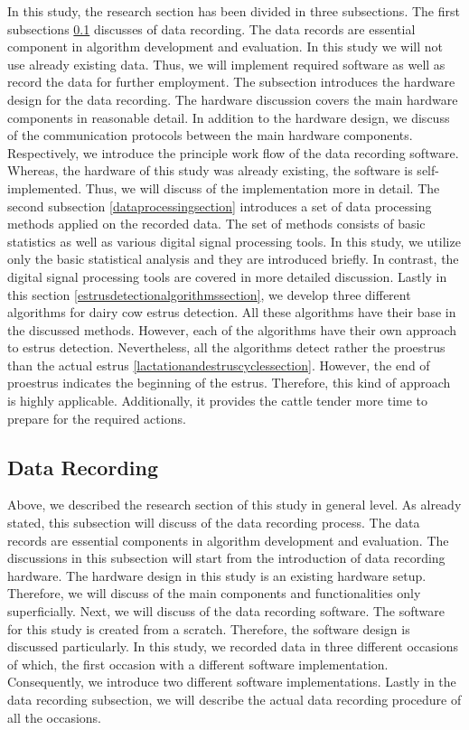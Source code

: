 \documentclass[english,12pt,a4paper,pdftex,elec,utf8]{aaltothesis}
\begin{document}
In this study, the research section has been divided in three subsections. The first subsections \ref{datarecordingsection}  discusses of data recording. The data records are essential component in algorithm development and evaluation. In this study we will not use already existing data. Thus, we will implement required software as well as record the data for further employment. The subsection introduces the hardware design for the data recording. The hardware discussion covers the main hardware components in reasonable detail. In addition to the hardware design, we discuss of the communication protocols between the main hardware components. Respectively, we introduce the principle work flow of the data recording software. Whereas, the hardware of this study was already existing, the software is self-implemented. Thus, we will discuss of  the implementation more in detail. The second subsection \ref{dataprocessingsection} introduces a set of data processing methods applied on the recorded data. The set of methods consists of basic statistics as well as various digital signal processing tools. In this study, we utilize only the basic statistical analysis and they are introduced briefly. In contrast, the digital signal processing tools are covered in more detailed discussion. Lastly in this section \ref{estrusdetectionalgorithmssection}, we develop three different algorithms for dairy cow estrus detection. All these algorithms have their base in the discussed methods. However, each of the algorithms have their own approach to estrus detection. Nevertheless, all the algorithms detect rather the proestrus than the actual estrus \ref{lactationandestruscyclessection}. However, the end of proestrus indicates the beginning of the estrus. Therefore, this kind of approach is highly applicable. Additionally, it provides the cattle tender more time to prepare for the required actions. 

\subsection{Data Recording} \label{datarecordingsection}

Above, we described the research section of this study in general level. As already stated, this subsection will discuss of the data recording process. The data records are essential components in algorithm development and evaluation. The discussions in this subsection will start from the introduction of data recording hardware. The hardware design in this study is an existing hardware setup. Therefore, we will discuss of the main components and functionalities only superficially. Next, we will discuss of the data recording software. The software for this study is created from a scratch. Therefore, the software design is discussed particularly. In this study, we recorded data in three different occasions of which, the first occasion with a different software implementation. Consequently, we introduce two different software implementations. Lastly in the data recording subsection, we will describe the actual data recording procedure of all the occasions.
\end{document}
